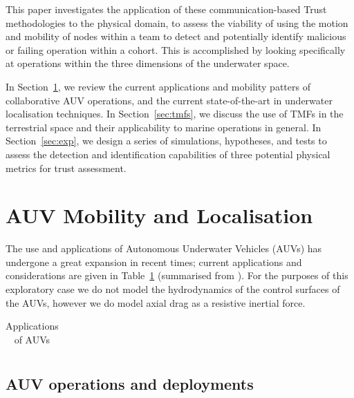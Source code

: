 \documentclass[conference]{IEEEtran}
\begin{document}
This paper investigates the application of these communication-based Trust methodologies to the physical domain, to assess the viability of using the motion and mobility of nodes within a team to detect and potentially identify malicious or failing operation within a cohort.
This is accomplished by looking specifically at operations within the three dimensions of the underwater space.

In Section~\ref{sec:mobility}, we review the current applications and mobility patters of collaborative AUV operations, and the current state-of-the-art in underwater localisation techniques.
In Section~\ref{sec:tmfs}, we discuss the use of TMFs in the terrestrial space and their applicability to marine operations in general. 
In Section~\ref{sec:exp}, we design a series of simulations, hypotheses, and tests to assess the detection and identification capabilities of three potential physical metrics for trust assessment.


\section{AUV Mobility and Localisation}\label{sec:mobility}

The use and applications of Autonomous Underwater Vehicles (AUVs) has undergone a great expansion in recent times; current applications and considerations are given in Table~\ref{tab:auv_apps} (summarised from \cite{Jalving2003}\cite{andThen}).
For the purposes of this exploratory case we do not model the hydrodynamics of the control surfaces of the AUVs, however we do model axial drag as a resistive inertial force.

\begin{table}[h]
  \caption{Applications of AUVs} \label{tab:auv_apps}
  \begin{center}
    \setlength{\tabcolsep}{8pt}
    \begin{tabular}{lcc}
      \toprule
      \bottomrule
    \end{tabular}
    \setlength{\tabcolsep}{6pt}
  \end{center}
\end{table}

\subsection{AUV operations and deployments}

\end{document}
